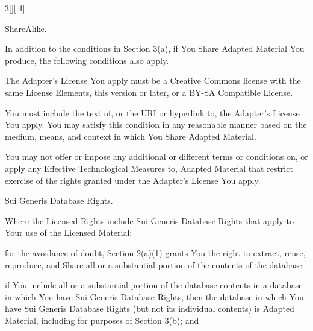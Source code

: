 \documentclass[8pt,a4paper]{article}
\begin{document}
\begin{multicols}{3}[][.4\paperwidth]
\begin{longenum}
\begin{longenum}
  \item ShareAlike.

     In addition to the conditions in Section 3(a), if You Share
     Adapted Material You produce, the following conditions also apply.

       \begin{longenum}

       \item The Adapter's License You apply must be a Creative Commons
          license with the same License Elements, this version or
          later, or a BY-SA Compatible License.

       \item You must include the text of, or the URI or hyperlink to, the
          Adapter's License You apply. You may satisfy this condition
          in any reasonable manner based on the medium, means, and
          context in which You Share Adapted Material.

       \item You may not offer or impose any additional or different terms
          or conditions on, or apply any Effective Technological
          Measures to, Adapted Material that restrict exercise of the
          rights granted under the Adapter's License You apply.

       \end{longenum}

  \end{longenum}


 \item Sui Generis Database Rights.

 Where the Licensed Rights include Sui Generis Database Rights that
 apply to Your use of the Licensed Material:

  \begin{longenum}

  \item for the avoidance of doubt, Section 2(a)(1) grants You the right
     to extract, reuse, reproduce, and Share all or a substantial
     portion of the contents of the database;

  \item if You include all or a substantial portion of the database
     contents in a database in which You have Sui Generis Database
     Rights, then the database in which You have Sui Generis Database
     Rights (but not its individual contents) is Adapted Material,
     including for purposes of Section 3(b); and


\end{longenum}
\end{longenum}
\end{multicols}
\end{document}
